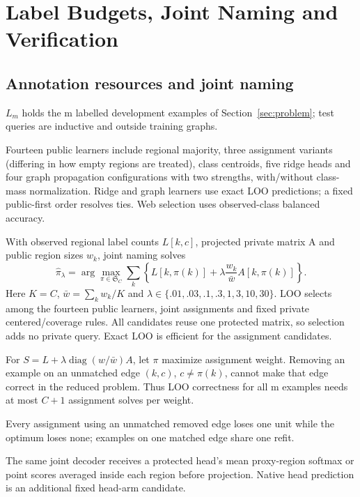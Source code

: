 \section{Label Budgets, Joint Naming and Verification}
\label{sec:quality}

\subsection{Annotation resources and joint naming}

$L_m$ holds the m labelled development examples of Section~\ref{sec:problem};
test queries are inductive and outside training graphs.

Fourteen public learners include regional majority, three assignment variants
(differing in how empty regions are treated), class centroids, five ridge
heads and four graph propagation configurations \cite{zhou2003consistency}
with two strengths, with/without class-mass normalization. Ridge and graph
learners use exact LOO predictions; a fixed public-first order resolves ties.
Web selection uses observed-class balanced accuracy.

With observed regional label counts $L[k,c]$, projected private matrix A and
public region sizes $w_k$, joint naming solves
\begin{equation}
\hat\pi_\lambda=\arg\max_{\pi\in\mathfrak S_C}
\sum_k\left\{L[k,\pi(k)]+\lambda\frac{w_k}{\bar w}A[k,\pi(k)]\right\}.
\label{eq:fusion}
\end{equation}
Here $K=C$, $\bar w=\sum_k w_k/K$ and
$\lambda\in\{.01,.03,.1,.3,1,3,10,30\}$. LOO selects among the fourteen
public learners, joint assignments and fixed private centered/coverage rules.
All candidates reuse one protected matrix, so selection adds no private
query. Exact LOO is efficient for the assignment candidates.

\begin{valueprop}
\label{prop:loo}
For $S=L+\lambda\operatorname{diag}(w/\bar w)A$, let $\pi$ maximize assignment
weight. Removing an example on an unmatched edge $(k,c)$, $c\ne\pi(k)$,
cannot make that edge correct in the reduced problem. Thus LOO correctness
for all m examples needs at most $C+1$ assignment solves per weight.
\end{valueprop}
Every assignment using an unmatched removed edge loses one unit while the
optimum loses none; examples on one matched edge share one refit.

The same joint decoder receives a protected head's mean proxy-region softmax
or point scores averaged inside each region before projection. Native head
prediction is an additional fixed head-arm candidate.

